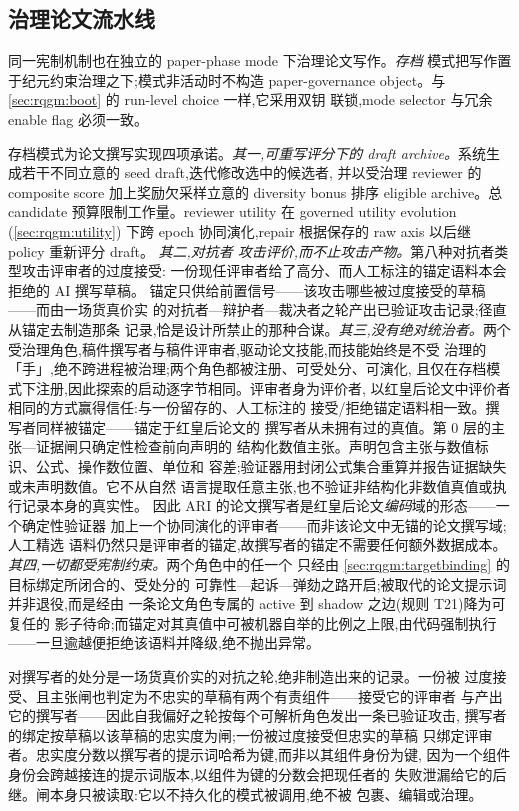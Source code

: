\subsection{治理论文流水线}\label{sec:rqgm:paper}

同一宪制机制也在独立的 paper-phase mode 下治理论文写作。\emph{存档}
模式把写作置于纪元约束治理之下;模式非活动时不构造 paper-governance
object。与 \cref{sec:rqgm:boot} 的 run-level choice 一样,它采用双钥
联锁,mode selector 与冗余 enable flag 必须一致。

存档模式为论文撰写实现四项承诺。\emph{其一,可重写评分下的 draft
archive。}系统生成若干不同立意的 seed draft,迭代修改选中的候选者,
并以受治理 reviewer 的 composite score 加上奖励欠采样立意的 diversity
bonus 排序 eligible archive。总 candidate 预算限制工作量。reviewer
utility 在 governed utility evolution (\cref{sec:rqgm:utility}) 下跨
epoch 协同演化,repair 根据保存的 raw axis 以后继 policy 重新评分 draft。
\emph{其二,对抗者
攻击评价,而不止攻击产物。}第八种对抗者类型攻击评审者的过度接受:
一份现任评审者给了高分、而人工标注的锚定语料本会拒绝的 AI 撰写草稿。
锚定只供给前置信号——该攻击哪些被过度接受的草稿——而由一场货真价实
的对抗者—辩护者—裁决者之轮产出已验证攻击记录;径直从锚定去制造那条
记录,恰是设计所禁止的那种合谋。\emph{其三,没有绝对统治者。}两个
受治理角色,稿件撰写者与稿件评审者,驱动论文技能,而技能始终是不受
治理的「手」,绝不跨进程被治理;两个角色都被注册、可受处分、可演化,
且仅在存档模式下注册,因此探索的启动逐字节相同。评审者身为评价者,
以红皇后论文中评价者相同的方式赢得信任:与一份留存的、人工标注的
接受/拒绝锚定语料相一致。撰写者同样被锚定——锚定于红皇后论文的
撰写者从未拥有过的真值。第 0 层的主张—证据闸只确定性检查前向声明的
结构化数值主张。声明包含主张与数值标识、公式、操作数位置、单位和
容差;验证器用封闭公式集合重算并报告证据缺失或未声明数值。它不从自然
语言提取任意主张,也不验证非结构化非数值真值或执行记录本身的真实性。
因此 ARI 的论文撰写者是红皇后论文\emph{编码}域的形态——一个确定性验证器
加上一个协同演化的评审者——而非该论文中无锚的论文撰写域;人工精选
语料仍然只是评审者的锚定,故撰写者的锚定不需要任何额外数据成本。
\emph{其四,一切都受宪制约束。}两个角色中的任一个
只经由 \cref{sec:rqgm:targetbinding} 的目标绑定所闭合的、受处分的
可靠性—起诉—弹劾之路开启;被取代的论文提示词并非退役,而是经由
一条论文角色专属的 active 到 shadow 之边(规则 T21)降为可复任的
影子待命;而锚定对其真值中可被机器自举的比例之上限,由代码强制执行
——一旦逾越便拒绝该语料并降级,绝不抛出异常。

对撰写者的处分是一场货真价实的对抗之轮,绝非制造出来的记录。一份被
过度接受、且主张闸也判定为不忠实的草稿有两个有责组件——接受它的评审者
与产出它的撰写者——因此自我偏好之轮按每个可解析角色发出一条已验证攻击,
撰写者的绑定按草稿以该草稿的忠实度为闸;一份被过度接受但忠实的草稿
只绑定评审者。忠实度分数以撰写者的提示词哈希为键,而非以其组件身份为键,
因为一个组件身份会跨越接连的提示词版本,以组件为键的分数会把现任者的
失败泄漏给它的后继。闸本身只被读取:它以不持久化的模式被调用,绝不被
包裹、编辑或治理。

